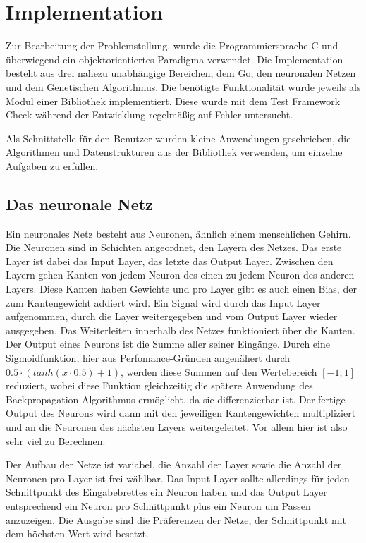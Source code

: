 \section{Implementation}

Zur Bearbeitung der Problemstellung, wurde die Programmiersprache C und
überwiegend ein objektorientiertes Paradigma verwendet.  Die Implementation
besteht aus drei nahezu unabhängige Bereichen, dem Go, den neuronalen Netzen
und dem Genetischen Algorithmus. Die benötigte Funktionalität wurde jeweils als
Modul einer Bibliothek implementiert.  Diese wurde mit dem Test Framework Check
\cite{check} während der Entwicklung regelmäßig auf Fehler untersucht.

Als Schnittstelle für den Benutzer wurden kleine Anwendungen geschrieben, die
Algorithmen und Datenstrukturen aus der Bibliothek verwenden, um einzelne
Aufgaben zu erfüllen.


\subsection{Das neuronale Netz}

Ein neuronales Netz besteht aus Neuronen, ähnlich einem menschlichen Gehirn. Die
Neuronen sind in Schichten angeordnet, den Layern des Netzes. Das erste Layer
ist dabei das Input Layer, das letzte das Output Layer. Zwischen den Layern
gehen Kanten von jedem Neuron des einen zu jedem Neuron des anderen Layers.
Diese Kanten haben Gewichte und pro Layer gibt es auch einen Bias, der zum
Kantengewicht addiert wird. Ein Signal wird durch das Input Layer aufgenommen,
durch die Layer weitergegeben und vom Output Layer wieder ausgegeben. Das
Weiterleiten innerhalb des Netzes funktioniert über die Kanten. Der Output eines
Neurons ist die Summe aller seiner Eingänge. Durch eine Sigmoidfunktion, hier
aus Perfomance-Gründen angenähert durch $\num{0,5}\cdot (tanh(x\cdot\num{0,5}) + 1)$, 
werden diese Summen auf den Wertebereich $[-1;1]$
reduziert, wobei diese Funktion gleichzeitig die spätere Anwendung des
Backpropagation Algorithmus ermöglicht, da sie differenzierbar ist. Der fertige Output des
Neurons wird dann mit den jeweiligen Kantengewichten multipliziert und an die
Neuronen des nächsten Layers weitergeleitet. Vor allem hier ist also sehr viel
zu Berechnen. 

Der Aufbau der Netze ist variabel, die Anzahl der Layer sowie die Anzahl der
Neuronen pro Layer ist frei wählbar. Das Input Layer sollte allerdings für jeden
Schnittpunkt des Eingabebrettes ein Neuron haben und das Output Layer
entsprechend ein Neuron pro Schnittpunkt plus ein Neuron um Passen anzuzeigen.
Die Ausgabe sind die Präferenzen der Netze, der Schnittpunkt mit dem höchsten
Wert wird besetzt. 

